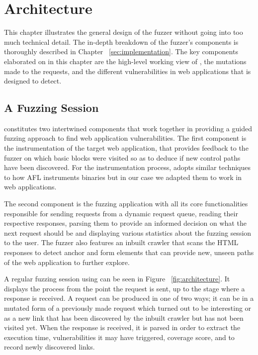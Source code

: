 \chapter{Architecture}
\label{sec:architecture}
\minitoc
\vspace*{1cm}

This chapter illustrates the general design of the fuzzer without going into too much technical detail. The in-depth breakdown of the fuzzer's components is thoroughly described in Chapter ~\ref{sec:implementation}. The key components elaborated on in this chapter are the high-level working view of \pname{}, the mutations made to the requests, and the different vulnerabilities in web applications that \pname{} is designed to detect.

\section{A Fuzzing Session}
\pname{} constitutes two intertwined components that work together in providing a guided fuzzing approach to find web application vulnerabilities. The first
component is the instrumentation of the target web application, that provides feedback to the fuzzer on which basic blocks were visited so as to deduce if new control paths have been discovered. For the instrumentation process, \pname{} adopts similar techniques to how AFL instruments binaries but in our case we adapted them to work in web applications. 

The second component is the fuzzing application with all its core functionalities responsible for sending requests from a dynamic request queue, reading their respective responses, parsing them to provide an informed decision on what the next request should be and displaying various statistics about the fuzzing session to the user. The fuzzer also features an inbuilt crawler that scans the HTML responses to detect anchor and form elements that can provide new, unseen paths of the web application to further explore.

A regular fuzzing session using \pname{} can be seen in Figure ~\ref{fig:architecture}. It displays the process from the point the request is sent, up to the stage where a response is received. A request can be produced in one of two ways; it can be in a mutated form of a previously made request which turned out to be interesting or as a new link that has been discovered by the inbuilt crawler but has not been visited yet. When the response is received, it is parsed in order to extract the execution time, vulnerabilities it may have triggered, coverage score, and to record newly discovered links.

